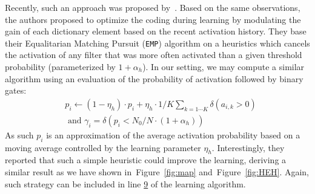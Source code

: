 \documentclass[vision,article,submit,oneauthor,pdftex]{Definitions/mdpi}
\newcommand{\seeFig}[1]{Figure~\ref{fig:#1}}%
\begin{document}
Recently, such an approach was proposed by~\cite{Sandin17}. Based on the same observations, the authors proposed to optimize the coding during learning by modulating the gain of each dictionary element based on the recent activation history. They base their Equalitarian Matching Pursuit (\texttt{EMP}) algorithm on a heuristics which cancels the activation of any filter that was more often activated than a given threshold probability (parameterized by $1+\alpha_h$). In our setting, we may compute a similar algorithm using an evaluation of the probability of activation followed by binary gates:
\begin{align}%
&p_i \leftarrow (1- \eta_h ) \cdot p_i + \eta_h \cdot 1/K\sum_{k=1\cdots K} \delta(a_{i, k} > 0) \\ &\textrm{ and }
\gamma_i = \delta (p_i < N_0/N \cdot (1+\alpha_h) )
\end{align}%
As such $p_i$ is an approximation of the average activation probability based on a moving average controlled by the learning parameter $\eta_h$.
Interestingly, they reported that such a simple heuristic could improve the learning, deriving a similar result as we have shown in~\seeFig{map} and~\seeFig{HEH}. %
Again, such strategy can be included in line \hyperlink{here2}{9} of the learning algorithm.
\end{document}

